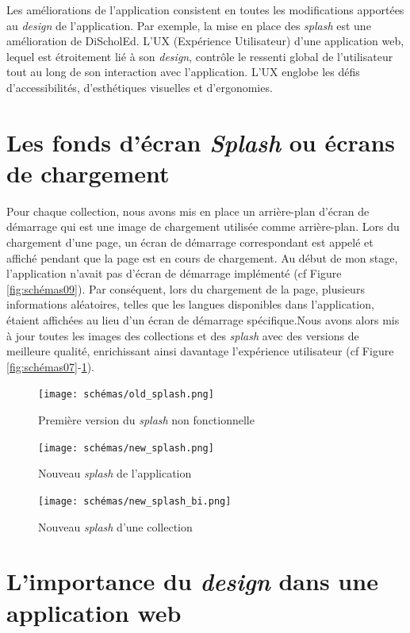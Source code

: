 Les améliorations de l'application consistent en toutes les modifications apportées au \textit{design} de l'application. Par exemple, la mise en place des \textit{splash} est une amélioration de DiScholEd. L'UX (Expérience Utilisateur) d'une application web, lequel est étroitement lié à son \textit{design}, contrôle le ressenti global de l'utilisateur tout au long de son interaction avec l'application. L'UX englobe les défis d'accessibilités, d'esthétiques visuelles et d'ergonomies.

\section{Les fonds d'écran \textit{Splash} ou écrans de chargement}

Pour chaque collection, nous avons mis en place un arrière-plan d'écran de démarrage qui est une image de chargement utilisée comme arrière-plan. Lors du chargement d'une page, un écran de démarrage correspondant est appelé et affiché pendant que la page est en cours de chargement. Au début de mon stage, l'application n'avait pas d'écran de démarrage implémenté (cf Figure \ref{fig:schémas09}). Par conséquent, lors du chargement de la page, plusieurs informations aléatoires, telles que les langues disponibles dans l'application, étaient affichées au lieu d'un écran de démarrage spécifique.Nous avons alors mis à jour toutes les images des collections et des \textit{splash} avec des versions de meilleure qualité, enrichissant ainsi davantage l'expérience utilisateur (cf Figure \ref{fig:schémas07}-\ref{fig:schémas08}).

\newpage

\begin{figure}[H]
\centering
\texttt{[image: schémas/old\_splash.png]}
\caption{Première version du \textit{splash} non fonctionnelle}
\label{fig:schémas09}

\centering
\texttt{[image: schémas/new\_splash.png]}
\caption{Nouveau \textit{splash} de l'application}
\label{fig:schémas07}

\centering
\texttt{[image: schémas/new\_splash\_bi.png]}
\caption{Nouveau \textit{splash} d'une collection}
\label{fig:schémas08}
\end{figure}

\section{L'importance du \textit{design} dans une application web}

